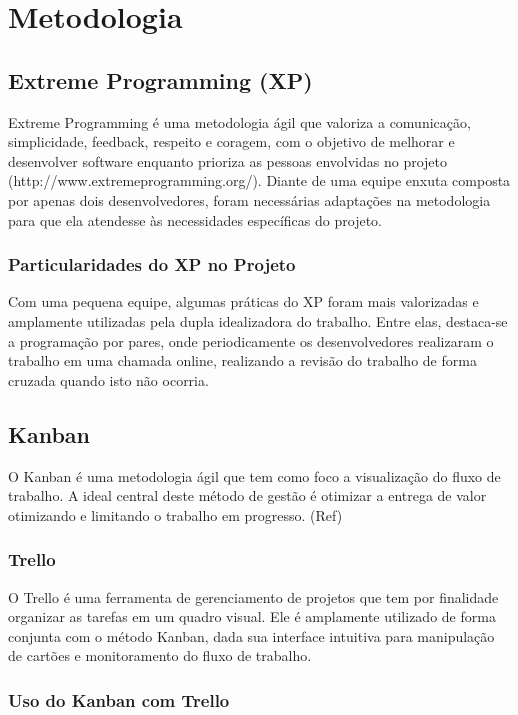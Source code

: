 \chapter[Metodologia]{Metodologia}

\section{Extreme Programming (XP)}
Extreme Programming é uma metodologia ágil que valoriza a comunicação, simplicidade, feedback, respeito e coragem, com o objetivo de melhorar e desenvolver software enquanto prioriza as pessoas envolvidas no projeto (http://www.extremeprogramming.org/). Diante de uma equipe enxuta composta por apenas dois desenvolvedores, foram necessárias adaptações na metodologia para que ela atendesse às necessidades específicas do projeto.

\subsection{Particularidades do XP no Projeto}
Com uma pequena equipe, algumas práticas do XP foram mais valorizadas e amplamente utilizadas pela dupla idealizadora do trabalho. Entre elas, destaca-se a programação por pares, onde periodicamente os desenvolvedores realizaram o trabalho em uma chamada online, realizando a revisão do trabalho de forma cruzada quando isto não ocorria.


\section{Kanban}
O Kanban é uma metodologia ágil que tem como foco a visualização do fluxo de trabalho. A ideal central deste método de gestão é otimizar a entrega de valor otimizando e limitando o trabalho em progresso. (Ref)

\subsection{Trello}
O Trello é uma ferramenta de gerenciamento de projetos que tem por finalidade organizar as tarefas em um quadro visual. Ele é amplamente utilizado de forma conjunta com o método Kanban, dada sua interface intuitiva para manipulação de cartões e monitoramento do fluxo de trabalho.

\subsection{Uso do Kanban com Trello}
